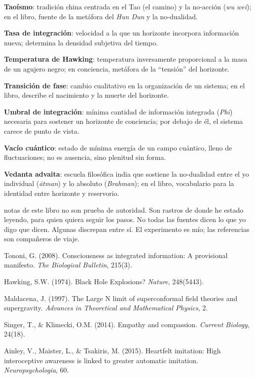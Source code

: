 \glos \textbf{Taoísmo}: tradición china centrada en el Tao (el camino) y la no-acción (\emph{wu wei}); en el libro, fuente de la metáfora del \emph{Hun Dun} y la no-dualidad.

\glos \textbf{Tasa de integración}: velocidad a la que un horizonte incorpora información nueva; determina la densidad subjetiva del tiempo.

\glos \textbf{Temperatura de Hawking}: temperatura inversamente proporcional a la masa de un agujero negro; en conciencia, metáfora de la “tensión” del horizonte.

\glos \textbf{Transición de fase}: cambio cualitativo en la organización de un sistema; en el libro, describe el nacimiento y la muerte del horizonte.

\glos \textbf{Umbral de integración}: mínima cantidad de información integrada (\emph{Phi}) necesaria para sostener un horizonte de conciencia; por debajo de él, el sistema carece de punto de vista.

\glos \textbf{Vacío cuántico}: estado de mínima energía de un campo cuántico, lleno de fluctuaciones; no es ausencia, sino plenitud sin forma.

\glos \textbf{Vedanta advaita}: escuela filosófica india que sostiene la no-dualidad entre el yo individual (\emph{ātman}) y lo absoluto (\emph{Brahman}); en el libro, vocabulario para la identidad entre horizonte y reservorio.

\noindent {} notas de este libro no son prueba de autoridad. Son rastros de donde he estado leyendo, para quien quiera seguir los pasos. No todas las fuentes dicen lo que yo digo que dicen. Algunas discrepan entre sí. El experimento es mío; las referencias son compañeros de viaje.

 Tononi, G. (2008). Consciousness as integrated information: A provisional manifesto. \emph{The Biological Bulletin}, 215(3).

 Hawking, S.W. (1974). Black Hole Explosions? \emph{Nature}, 248(5443).

 Maldacena, J. (1997). The Large N limit of superconformal field theories and supergravity. \emph{Advances in Theoretical and Mathematical Physics}, 2.

 Singer, T., \& Klimecki, O.M. (2014). Empathy and compassion. \emph{Current Biology}, 24(18).

 Ainley, V., Maister, L., \& Tsakiris, M. (2015). Heartfelt imitation: High interoceptive awareness is linked to greater automatic imitation. \emph{Neuropsychologia}, 60.

